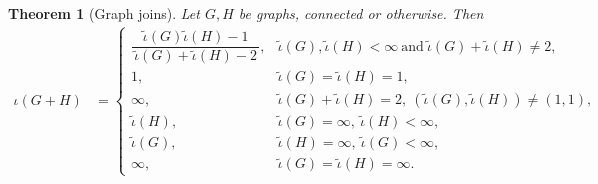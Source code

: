 \documentclass[11pt,a4paper]{article}
\newtheorem{theorem}{Theorem}[section]
\begin{document}
    \begin{theorem}[Graph joins]\label{thm:index-join}
        Let $G, H$ be graphs, connected or otherwise. Then 
            {\footnotesize\begin{align}\label{eq:beta-join}
                \iota(G+ H) &= \begin{cases}
                    \dfrac{\widetilde{\iota}(G) \widetilde{\iota}(H)-1}{\,\widetilde{\iota}(G)+\widetilde{\iota}(H)-2\,}, & \widetilde{\iota}(G),\widetilde{\iota}(H)<\infty\ \text{and}\ \widetilde{\iota}(G)+\widetilde{\iota}(H)\neq 2,\\
                    1, & \widetilde{\iota}(G)=\widetilde{\iota}(H)=1,\\
                    \infty, & \widetilde{\iota}(G)+\widetilde{\iota}(H)=2,\ (\widetilde{\iota}(G),\widetilde{\iota}(H))\neq(1, 1),\\
                    \widetilde{\iota}(H), & \widetilde{\iota}(G)=\infty,\ \widetilde{\iota}(H)<\infty,\\
                    \widetilde{\iota}(G), & \widetilde{\iota}(H)=\infty,\ \widetilde{\iota}(G)<\infty,\\
                    \infty, & \widetilde{\iota}(G)=\widetilde{\iota}(H)=\infty.
                \end{cases}
            \end{align}}
    \end{theorem}
    
\end{document}

